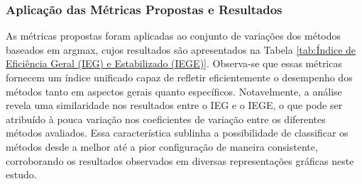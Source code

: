 \subsubsection{Aplicação das Métricas Propostas e Resultados}

As métricas propostas foram aplicadas ao conjunto de variações dos métodos baseados em argmax, cujos resultados são apresentados na Tabela \ref{tab:Índice de Eficiência Geral (IEG) e Estabilizado (IEGE)}. Observa-se que essas métricas fornecem um índice unificado capaz de refletir eficientemente o desempenho dos métodos tanto em aspectos gerais quanto específicos. Notavelmente, a análise revela uma similaridade nos resultados entre o IEG e o IEGE, o que pode ser atribuído à pouca variação nos coeficientes de variação entre os diferentes métodos avaliados. Essa característica sublinha a possibilidade de classificar os métodos desde a melhor até a pior configuração de maneira consistente, corroborando os resultados observados em diversas representações gráficas neste estudo.

